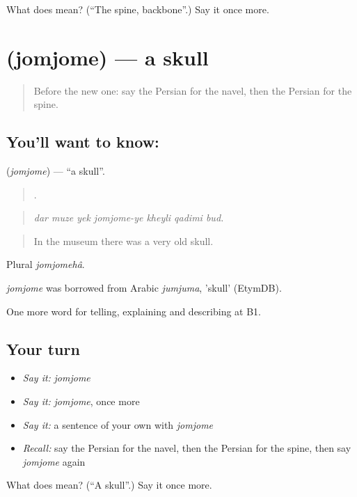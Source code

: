 \begin{tcolorbox}[breakable,colback=teal!4,colframe=teal!35!black,title={Before you move on}]
What does   mean? (\textquotedblleft{}The spine, backbone\textquotedblright{}.) Say it once more.
\end{tcolorbox}
\section[\texorpdfstring{\fa{جمجمه} (jomjome)}{جمجمه (jomjome)}]{ (jomjome) — a skull}

\label{lesson:FA-C497-jomjome}



\begin{quote}
Before the new one: say the Persian for the navel, then the Persian for the spine.
\end{quote}

\subsection*{You'll want to know: }
\textbf{} (\emph{jomjome}) — \textquotedblleft{}a skull\textquotedblright{}.

\begin{quote}
      .
\end{quote}

\begin{quote}
\emph{dar muze yek jomjome-ye kheyli qadimi bud.}
\end{quote}

\begin{quote}
In the museum there was a very old skull.
\end{quote}

Plural \emph{jomjomehâ}.

\begin{cousinweb}
\emph{jomjome} was borrowed from Arabic \emph{jumjuma}, 'skull' (EtymDB).
\end{cousinweb}

\begin{grammarlens}[title={What you've built}]
One more word for telling, explaining and describing at B1.
\end{grammarlens}

\subsection*{Your turn}
\begin{itemize}
\raggedright
  \item \emph{Say it:} \emph{jomjome}
  \item \emph{Say it:} \emph{jomjome}, once more
  \item \emph{Say it:} a sentence of your own with \emph{jomjome}
  \item \emph{Recall:} say the Persian for the navel, then the Persian for the spine, then say \emph{jomjome} again
\end{itemize}

\begin{tcolorbox}[breakable,colback=teal!4,colframe=teal!35!black,title={Before you move on}]
What does  mean? (\textquotedblleft{}A skull\textquotedblright{}.) Say it once more.
\end{tcolorbox}
